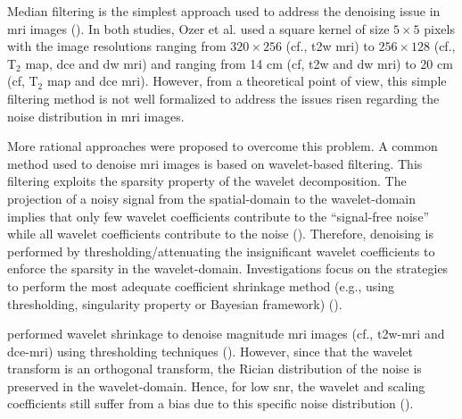\begin{enumerate}[leftmargin=*]
Median filtering is the simplest approach used to address the denoising issue in \ac{mri} images (\cite{Ozer2009,Ozer2010}). In both studies, Ozer et al. used a square kernel of size $5 \times 5$ pixels with the image resolutions ranging from $320 \times 256$ (cf., \ac{t2w} \ac{mri}) to $256 \times 128$ (cf., T$_2$ map, \ac{dce} and \ac{dw} \ac{mri}) and  ranging from 14 cm (cf, \ac{t2w} and \ac{dw} \ac{mri}) to 20 cm (cf, T$_2$ map and \ac{dce} \ac{mri}). However, from a theoretical point of view, this simple filtering method is not well formalized to address the issues risen regarding the noise distribution in \ac{mri} images.

More rational approaches were proposed to overcome this problem. A common method used to denoise \ac{mri} images is based on wavelet-based filtering. This filtering exploits the sparsity property of the wavelet decomposition. The projection of a noisy signal from the spatial-domain to the wavelet-domain implies that only few wavelet coefficients contribute to the ``signal-free noise'' while all wavelet coefficients contribute to the noise (\cite{Donoho1994}). Therefore, denoising is performed by thresholding/attenuating the insignificant wavelet coefficients to enforce the sparsity in the wavelet-domain. Investigations focus on the strategies to perform the most adequate coefficient shrinkage method (e.g., using thresholding, singularity property or Bayesian framework) (\cite{Pizurica2002}).

\cite{Ampeliotis2007,Ampeliotis2008} performed wavelet shrinkage to denoise magnitude \ac{mri} images (cf., \ac{t2w}-\ac{mri} and \ac{dce}-\ac{mri}) using thresholding techniques (\cite{Mallat2008}). However, since that the wavelet transform is an orthogonal transform, the Rician distribution of the noise is preserved in the wavelet-domain. Hence, for low \ac{snr}, the wavelet and scaling coefficients still suffer from a bias due to this specific noise distribution (\cite{Nowak1999}). 


\end{enumerate}
